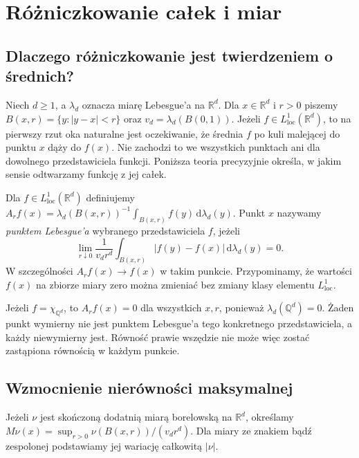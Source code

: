 \chapter{Różniczkowanie całek i miar}
\label{ch:differentiation-25}

\section{Dlaczego różniczkowanie jest twierdzeniem o średnich?}
Niech $d\ge1$, a $\lambda_d$ oznacza miarę Lebesgue'a na
$\mathbb R^d$. Dla $x\in\mathbb R^d$ i $r>0$ piszemy
$B(x,r)=\{y:|y-x|<r\}$ oraz $v_d=\lambda_d(B(0,1))$.
Jeżeli $f\in L^1_{\mathrm{loc}}(\mathbb R^d)$, to na pierwszy
rzut oka naturalne jest oczekiwanie, że średnia $f$ po kuli
malejącej do punktu $x$ dąży do $f(x)$. Nie zachodzi to
we wszystkich punktach ani dla dowolnego przedstawiciela
funkcji. Poniższa teoria precyzyjnie określa, w jakim
sensie odtwarzamy funkcję z jej całek.

\begin{definicja}
\label{def:lebesgue-point-25}
Dla $f\in L^1_{\mathrm{loc}}(\mathbb R^d)$ definiujemy
$A_rf(x)=\lambda_d(B(x,r))^{-1}\int_{B(x,r)}f(y)\,\mathrm d\lambda_d(y)$.
Punkt $x$ nazywamy \emph{punktem Lebesgue'a} wybranego
przedstawiciela $f$, jeżeli
\begin{equation}\label{eq:lebesgue-point-25}
 \lim_{r\downarrow0}\frac1{v_dr^d}
 \int_{B(x,r)}|f(y)-f(x)|\,\mathrm d\lambda_d(y)=0.
\end{equation}
W szczególności $A_rf(x)\to f(x)$ w takim punkcie.
Przypominamy, że wartości $f(x)$ na zbiorze miary zero
można zmieniać bez zmiany klasy elementu $L^1_{\mathrm{loc}}$.
\end{definicja}

\begin{przyklad}
Jeżeli $f=\chi_{\mathbb Q^d}$, to $A_rf(x)=0$ dla
wszystkich $x,r$, ponieważ $\lambda_d(\mathbb Q^d)=0$.
Żaden punkt wymierny nie jest punktem Lebesgue'a tego
konkretnego przedstawiciela, a każdy niewymierny jest.
Równość prawie wszędzie nie może więc zostać zastąpiona
równością w każdym punkcie.
\end{przyklad}

\section{Wzmocnienie nierówności maksymalnej}
\begin{definicja}
\label{def:max-measure-25}
Jeżeli $\nu$ jest skończoną dodatnią miarą borelowską
na $\mathbb R^d$, określamy
$M\nu(x)=\sup_{r>0}\nu(B(x,r))/(v_dr^d)$.
Dla miary ze znakiem bądź zespolonej podstawiamy jej
wariację całkowitą $|\nu|$.
\end{definicja}

